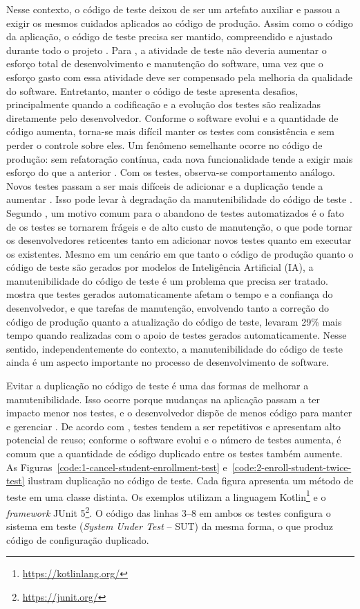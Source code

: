 Nesse contexto, o código de teste deixou de ser um artefato auxiliar e passou a exigir os mesmos cuidados aplicados ao código de produção. Assim como o código da aplicação, o código de teste precisa ser mantido, compreendido e ajustado durante todo o projeto \cite{greiler:etal:2013:b}. Para , a atividade de teste não deveria aumentar o esforço total de desenvolvimento e manutenção do software, uma vez que o esforço gasto com essa atividade deve ser compensado pela melhoria da qualidade do software. Entretanto, manter o código de teste apresenta desafios, principalmente quando a codificação e a evolução dos testes são realizadas diretamente pelo desenvolvedor. Conforme o software evolui e a quantidade de código aumenta, torna-se mais difícil manter os testes com consistência e sem perder o controle sobre eles. Um fenômeno semelhante ocorre no código de produção: sem refatoração contínua, cada nova funcionalidade tende a exigir mais esforço do que a anterior \cite{fowler:1999}. Com os testes, observa-se comportamento análogo. Novos testes passam a ser mais difíceis de adicionar e a duplicação tende a aumentar \cite{berner:etal:2005}. Isso pode levar à degradação da manutenibilidade do código de teste \cite{greiler:etal:2013:a}. Segundo , um motivo comum para o abandono de testes automatizados é o fato de os testes se tornarem frágeis e de alto custo de manutenção, o que pode tornar os desenvolvedores reticentes tanto em adicionar novos testes quanto em executar os existentes. Mesmo em um cenário em que tanto o código de produção quanto o código de teste são gerados por modelos de Inteligência Artificial (IA), a manutenibilidade do código de teste é um problema que precisa ser tratado.  mostra que testes gerados automaticamente afetam o tempo e a confiança do desenvolvedor, e que tarefas de manutenção, envolvendo tanto a correção do código de produção quanto a atualização do código de teste, levaram 29\% mais tempo quando realizadas com o apoio de testes gerados automaticamente. Nesse sentido, independentemente do contexto, a manutenibilidade do código de teste ainda é um aspecto importante no processo de desenvolvimento de software.

Evitar a duplicação no código de teste é uma das formas de melhorar a manutenibilidade. Isso ocorre porque mudanças na aplicação passam a ter impacto menor nos testes, e o desenvolvedor dispõe de menos código para manter e gerenciar \cite{berner:etal:2005,greiler:etal:2013:a}. De acordo com , testes tendem a ser repetitivos e apresentam alto potencial de reuso; conforme o software evolui e o número de testes aumenta, é comum que a quantidade de código duplicado entre os testes também aumente. As Figuras~\ref{code:1-cancel-student-enrollment-test} e~\ref{code:2-enroll-student-twice-test} ilustram duplicação no código de teste. Cada figura apresenta um método de teste em uma classe distinta. Os exemplos utilizam a linguagem Kotlin\footnote{\url{https://kotlinlang.org/}} e o \textit{framework} JUnit 5\footnote{\url{https://junit.org/}}. O código das linhas 3--8 em ambos os testes configura o sistema em teste (\textit{System Under Test} -- SUT) da mesma forma, o que produz código de configuração duplicado.

